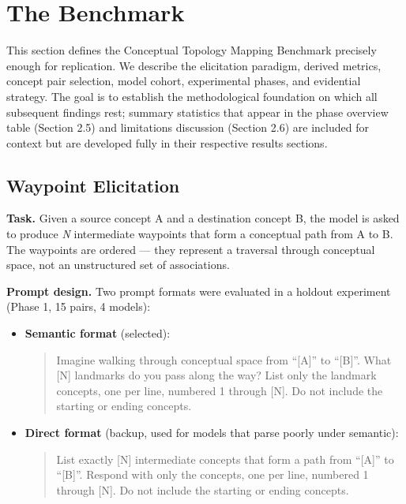 \section{The Benchmark}\label{the-benchmark}

This section defines the Conceptual Topology Mapping Benchmark precisely enough for replication. We describe the elicitation paradigm, derived metrics, concept pair selection, model cohort, experimental phases, and evidential strategy. The goal is to establish the methodological foundation on which all subsequent findings rest; summary statistics that appear in the phase overview table (Section 2.5) and limitations discussion (Section 2.6) are included for context but are developed fully in their respective results sections.

\subsection{Waypoint Elicitation}\label{waypoint-elicitation}

\textbf{Task.} Given a source concept A and a destination concept B, the model is asked to produce \emph{N} intermediate waypoints that form a conceptual path from A to B. The waypoints are ordered --- they represent a traversal through conceptual space, not an unstructured set of associations.

\textbf{Prompt design.} Two prompt formats were evaluated in a holdout experiment (Phase 1, 15 pairs, 4 models):

\begin{itemize}
\item
  \textbf{Semantic format} (selected):

  \begin{quote}
  Imagine walking through conceptual space from ``{[}A{]}'' to ``{[}B{]}''. What {[}N{]} landmarks do you pass along the way? List only the landmark concepts, one per line, numbered 1 through {[}N{]}. Do not include the starting or ending concepts.
  \end{quote}
\item
  \textbf{Direct format} (backup, used for models that parse poorly under semantic):

  \begin{quote}
  List exactly {[}N{]} intermediate concepts that form a path from ``{[}A{]}'' to ``{[}B{]}''. Respond with only the concepts, one per line, numbered 1 through {[}N{]}. Do not include the starting or ending concepts.
  \end{quote}
\end{itemize}

